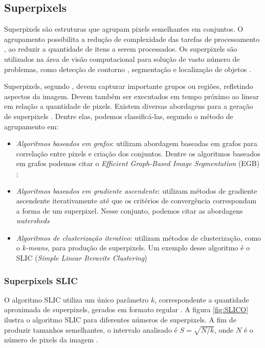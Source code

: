\begin{document}
\subsection{Superpixels} \label{ssec:super}

Superpixels são estruturas que agrupam pixels semelhantes em conjuntos. O agrupamento possibilita a redução de complexidade das tarefas de processamento \cite{SLIC}, ao reduzir a quantidade de itens a serem processados. Os superpixels são utilizados na área de visão computacional para solução de vasto número de problemas, como detecção de contorno \cite{CONTOUR}, segmentação \cite{SEG_MERGE} e localização de objetos \cite{SEG_LOCALIZ}.

Superpixels, segundo \cite{FELZENSZWALB}, devem capturar importante grupos ou regiões, refletindo aspectos da imagem. Devem também ser executados em tempo próximo ao linear em relação a quantidade de pixels. Existem diversas abordagens para a geração de superpixels \cite{SLIC}. Dentre elas, podemos classificá-las, segundo o método de agrupamento em: 

\begin{itemize}
 \item \textit{Algoritmos baseados em grafos}: utilizam abordagem baseadas em grafos para correlação entre pixels e criação dos conjuntos. Dentre os algoritmos baseados em grafos podemos citar o \textit{Efficient Graph-Based Image Segmentation} (EGB) \cite{FELZENSZWALB};
 \item \textit{Algoritmos baseados em gradiente ascendente}: utilizam métodos de gradiente ascendente iterativamente até que os critérios de convergência correspondam a forma de um superpixel. Nesse conjunto, podemos  citar as abordagens \textit{watersheds} \cite{WATERSHEDS} \cite{SLIC}
 \item \textit{Algoritmos de clusterização iterativo}: utilizam métodos de clusterização, como o \textit{k-means}, para produção de superpixels. Um exemplo desse algoritmo é o SLIC (\textit{Simple Linear Iteravite Clustering}) \cite{SLIC}
\end{itemize}


\subsubsection{Superpixels SLIC} \label{sssec:slic}

O algoritmo SLIC utiliza um único parâmetro $k$, correspondente a quantidade aproximada de superpixels, gerados em formato regular \cite{SLIC}. A figura \ref{fig:SLICO} ilustra o algoritmo SLIC para diferentes números de superpixels. A fim de produzir tamanhos semelhantes, o intervalo analisado é \mbox{$S=\sqrt{N/k}$}, onde $N$ é o número de pixels da imagem \cite{SLIC}. 
\end{document}

